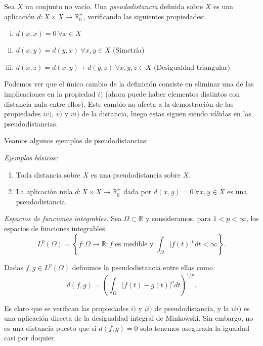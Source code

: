 \documentclass[ oneside,openany,titlepage,numbers=noenddot,headinclude,%
                footinclude=true,cleardoublepage=empty,abstractoff, %
                BCOR=5mm,paper=a4,fontsize=11pt,%
                spanish,american%
                ]{scrreprt}
\begin{document}
\begin{definition}[Distancia]
	Sea $X$ un conjunto no vacío. Una \emph{pseudodistancia} definida sobre $X$ es una aplicación $d:X\times X \to \mathbb{R}^{+}_{0}$, verificando las siguientes propiedades:
	
	\begin{enumerate}[i)]
		\item $d(x,x)=0  \ \forall x \in X$
		\item $d(x,y)=d(y,x) \ \forall x,y \in X$ (Simetría)
		\item $d(x,z)=d(x,y)+d(y,z) \ \forall x,y,z \in X$ (Desigualdad triangular)
	\end{enumerate}
	
\end{definition}

\remb

Podemos ver que el único cambio de la definición consiste en eliminar una de las implicaciones en la propiedad $i)$ (ahora puede haber elementos distintos con distancia nula entre ellos). Este cambio no afecta a la demostración de las propiedades $iv)$, $v)$ y $vi)$ de la distancia, luego estas siguen siendo válidas en las pseudodistancias.

\reme

Veamos algunos ejemplos de pseudodistancias:

\exampleb

\emph{Ejemplos básicos:}

\begin{enumerate}[1]
	\item Toda distancia sobre $X$ es una pseudodistancia sobre $X$.
	\item La aplicación nula $d:X\times X \to \mathbb{R}^+_0$ dada por $d(x,y) = 0 \ \forall x,y \in X$ es una pseudodistancia.
	
\end{enumerate}

\examplee

\exampleb

\emph{Espacios de funciones integrables.} Sea $\Omega \subset \mathbb{R}$ y consideramos, para $1 < p < \infty$, los espacios de funciones integrables 
\[L^p(\Omega)=\left\{f:\Omega \to \mathbb{R} : f \text{ es medible y } \int_{\Omega} |f(t)|^p dt < \infty \right\}.\]

Dadas $f,g \in L^p(\Omega)$ definimos la pseudodistancia entre ellas como \[d(f,g)=\left(\int_{\Omega}|f(t)-g(t)|^p dt\right)^{1/p}.\]

Es claro que se verifican las propiedades $i)$ y $ii)$ de pseudodistancia, y la $iii)$ es una aplicación directa de la desigualdad integral de Minkowski. Sin embargo, no es una distancia puesto que si $d(f,g)=0$ solo tenemos asegurada la igualdad casi por doquier.
\end{document}
